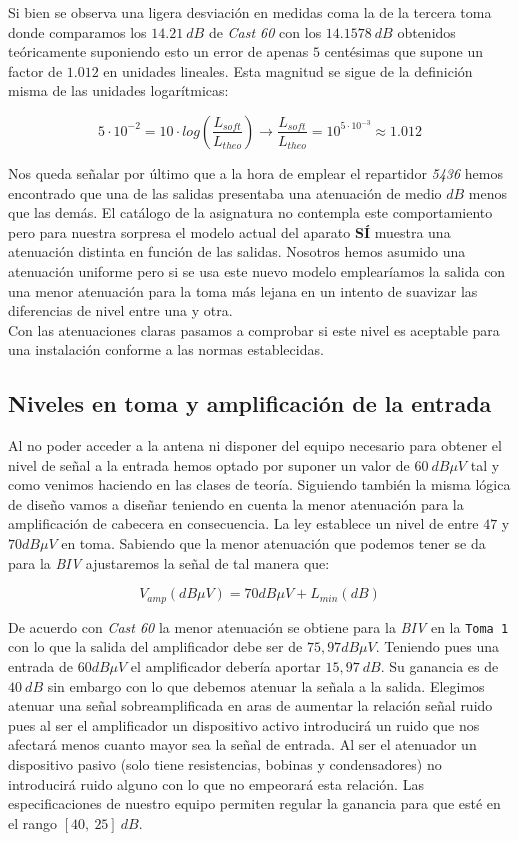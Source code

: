 \documentclass{article}[12 pt]
\begin{document}
			Si bien se observa una ligera desviación en medidas coma la de la tercera toma donde comparamos los $14.21\ dB$ de \textit{Cast 60} con los $14.1578\ dB$ obtenidos teóricamente suponiendo esto un error de apenas $5$ centésimas que supone un factor de $1.012$ en unidades lineales. Esta magnitud se sigue de la definición misma de  las unidades logarítmicas:

			$$5 \cdot 10^{-2} = 10 \cdot log(\frac{L_{soft}}{L_{theo}}) \rightarrow \frac{L_{soft}}{L_{theo}} = 10^{5 \cdot 10^{-3}} \approx 1.012$$

			Nos queda señalar por último que a la hora de emplear el repartidor \textit{5436} hemos encontrado que una de las salidas presentaba una atenuación de medio $dB$ menos que las demás. El catálogo de la asignatura no contempla este comportamiento pero para nuestra sorpresa el modelo actual del aparato \textbf{SÍ} muestra una atenuación distinta en función de las salidas. Nosotros hemos asumido una atenuación uniforme pero si se usa este nuevo modelo emplearíamos la salida con una menor atenuación para la toma más lejana en un intento de suavizar las diferencias de nivel entre una y otra.\\

			Con las atenuaciones claras pasamos a comprobar si este nivel es aceptable para una instalación conforme a las normas establecidas.

		\subsection{Niveles en toma y amplificación de la entrada}
			Al no poder acceder a la antena ni disponer del equipo necesario para obtener el nivel de señal a la entrada hemos optado por suponer un valor de $60\ dB\mu V$ tal y como venimos haciendo en las clases de teoría. Siguiendo también la misma lógica de diseño vamos a diseñar teniendo en cuenta la menor atenuación para la amplificación de cabecera en consecuencia. La ley establece un nivel de entre $47$ y $70 dB\mu V$ en toma. Sabiendo que la menor atenuación que podemos tener se da para la \textit{BIV} ajustaremos la señal de tal manera que:

			$$V_{amp}(dB\mu V) = 70 dB\mu V + L_{min}(dB)$$

			De acuerdo con \textit{Cast 60} la menor atenuación se obtiene para la \textit{BIV} en la \texttt{Toma 1} con lo que la salida del amplificador debe ser de $75,97 dB\mu V$. Teniendo pues una entrada de $60 dB\mu V$ el amplificador debería aportar $15,97\ dB$. Su ganancia es de $40\ dB$ sin embargo con lo que debemos atenuar la señala a la salida. Elegimos atenuar una señal sobreamplificada en aras de aumentar la relación señal ruido pues al ser el amplificador un dispositivo activo introducirá un ruido que nos afectará menos cuanto mayor sea la señal de entrada. Al ser el atenuador un dispositivo pasivo (solo tiene resistencias, bobinas y condensadores) no introducirá ruido alguno con lo que no empeorará esta relación. Las especificaciones de nuestro equipo permiten regular la ganancia para que esté en el rango $[40,\ 25]\ dB$.\\
\end{document}
